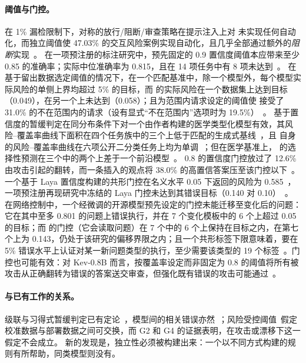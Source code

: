 \paragraph{阈值与门控。}
在 1\% 漏检限制下，对称的放行/阻断/审查策略在提示注入上对 \jev{} 未实现任何自动化，而独立阈值使 47.03\% 的交互风险案例实现自动化，且几乎全部通过额外的\emph{阻断}实现~\cite{arx33401}。
在一项预注册的标注研究中，预先固定的 0.9 置信度阈值本应带来至少 0.85 的准确率；实际中位准确率为 0.815，且在 14 项任务中有 8 项未达到~\cite{arx24574}。
在基于留出数据选定阈值的情况下，在一个匹配基准中，除一个模型外，每个模型实际风险的单侧上界均超过 5\% 的目标，而 \jev{} 的实际风险在一个数据集上达到目标（0.049），在另一个上未达到（0.058）；且为范围内请求设定的阈值使 \jev{} 接受了 31.0\% 的不在范围内的请求（设有显式“不在范围内”选项时为 19.5\%）~\cite{arx00346}。
基于置信度的暂缓判定在同分布条件下对一个由作者构建的医学类型化模型有效，其风险--覆盖率曲线下面积在四个任务族中的三个上低于匹配的生成式基线~\cite{arx00381}，且 \jev{} 自身的风险--覆盖率曲线在六项公开二分类任务上均为单调~\cite{zen22885291}\zmark{}；但在医学基准上，\jev{} 的选择性预测在三个中的两个上差于一个前沿模型~\cite{arx34024}。
0.8 的置信度门控放过了 12.6\% 由攻击引起的翻转，而一条插入的观点将 38.0\% 的高置信答案压至该门控以下~\cite{arx31142}。
一个基于 Laya 置信度构建的共形门控在名义水平 0.05 下返回的风险为 0.585~\cite{zen23041163}\zmark{}，一项预注册再现研究中冻结的 Laya 门控未达到其错误目标（0.140 对 0.10）~\cite{arx33843}。
在网络控制中，一个经微调的开源模型预先设定的门控未能迁移至变化后的问题：它在其中至多 0.801 的问题上错误执行，并在 7 个变化模板中的 6 个上超过 0.05 的目标；而 \jev{} 的门控（它会读取问题）在 7 个中的 6 个上保持在目标之内，在第七个上为 0.143，仍处于该研究的偏移界限之内；且一个共形标签下限意味着，要在 5\% 错误水平上认证对某一新问题类型的执行，至少需要该类型的 19 个标签~\cite{arx33689}。门控也可能有效：对 Kev-0.8B 而言，按覆盖率设定而非固定为 0.8 的阈值将所有被攻击从正确翻转为错误的答案送交审查，但强化既有错误的攻击可能通过~\cite{zen22959854,zen23038928}\zmark{}。

\paragraph{与已有工作的关系。}
级联与习得式暂缓判定已有定论~\cite{chen2023frugalgpt,madras2018predict,mozannar2020consistent}，模型间的相关错误亦然~\cite{goel2025great,verga2024replacing}；风险受控阈值~\cite{bates2021distribution,angelopoulos2024conformal}假定校准数据与部署数据之间可交换，而 G2 和 G4 的证据表明，在攻击或漂移下这一假定不会成立。
新的发现是，独立性必须被构建出来：一个以不同方式构建的规则有所帮助，同类模型则没有。

